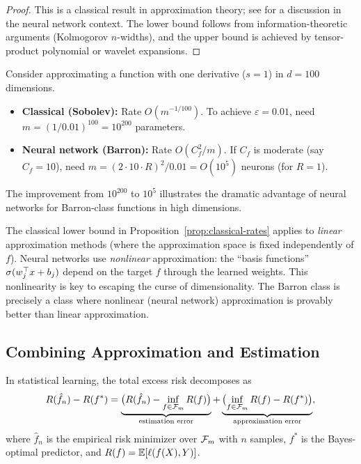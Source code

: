 \documentclass[11pt,a4paper]{article}
\begin{document}
\begin{proof}
This is a classical result in approximation theory; see
\citet[Chapter 7]{bach2024} for a discussion in the neural network context.
The lower bound follows from information-theoretic arguments
(Kolmogorov $n$-widths), and the upper bound is achieved by tensor-product
polynomial or wavelet expansions.
\end{proof}

\begin{example}
\label{ex:sobolev-vs-barron}
Consider approximating a function with one derivative ($s = 1$) in
$d = 100$ dimensions.
\begin{itemize}[nosep]
  \item \textbf{Classical (Sobolev):} Rate $O(m^{-1/100})$.  To achieve
    $\varepsilon = 0.01$, need $m = (1/0.01)^{100} = 10^{200}$ parameters.
  \item \textbf{Neural network (Barron):} Rate $O(C_f^2/m)$.  If $C_f$ is
    moderate (say $C_f = 10$), need $m = (2 \cdot 10 \cdot R)^2 / 0.01
    = O(10^5)$ neurons (for $R = 1$).
\end{itemize}
The improvement from $10^{200}$ to $10^5$ illustrates the dramatic
advantage of neural networks for Barron-class functions in high dimensions.
\end{example}

\begin{remark}
\label{rem:linear-vs-nonlinear}
The classical lower bound in Proposition~\ref{prop:classical-rates} applies
to \emph{linear} approximation methods (where the approximation space is
fixed independently of $f$).  Neural networks use \emph{nonlinear}
approximation: the ``basis functions'' $\sigma(w_j^\top x + b_j)$
depend on the target $f$ through the learned weights.  This nonlinearity
is key to escaping the curse of dimensionality.  The Barron class is
precisely a class where nonlinear (neural network) approximation is
provably better than linear approximation.
\end{remark}

\subsection{Combining Approximation and Estimation}
\label{sec:approx-estimation}

In statistical learning, the total excess risk decomposes as
\begin{equation}
\label{eq:bias-variance}
  R(\hat{f}_n) - R(f^*)
  = \underbrace{\bigl(R(\hat{f}_n) - \inf_{f \in \mathcal{F}_m}
    R(f)\bigr)}_{\text{estimation error}}
  + \underbrace{\bigl(\inf_{f \in \mathcal{F}_m} R(f) - R(f^*)
    \bigr)}_{\text{approximation error}},
\end{equation}
where $\hat{f}_n$ is the empirical risk minimizer over $\mathcal{F}_m$ with
$n$ samples, $f^*$ is the Bayes-optimal predictor, and $R(f) =
\mathbb{E}[\ell(f(X), Y)]$.
\end{document}
